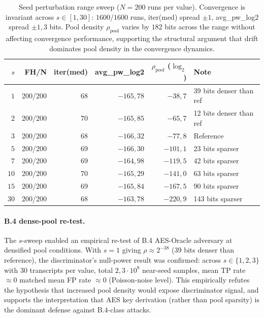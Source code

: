 \documentclass[11pt,a4paper]{article}
\begin{document}
\begin{table}[ht]
\centering
\small
\begin{tabular}{rrrrrl}
\toprule
$s$ & FH/N & iter(med) & avg\_pw\_log2 & $\rho_\text{pool}$ ($\log_2$) & Note \\
\midrule
$1$ & 200/200 & 68 & $-165{,}78$ & $-38{,}7$ & 39 bits denser than ref \\
$2$ & 200/200 & 70 & $-165{,}85$ & $-65{,}7$ & 12 bits denser than ref \\
$3$ & 200/200 & 68 & $-166{,}32$ & $-77{,}8$ & Reference \\
$5$ & 200/200 & 69 & $-166{,}30$ & $-101{,}1$ & 23 bits sparser \\
$7$ & 200/200 & 69 & $-164{,}98$ & $-119{,}5$ & 42 bits sparser \\
$10$ & 200/200 & 70 & $-165{,}29$ & $-141{,}0$ & 63 bits sparser \\
$15$ & 200/200 & 69 & $-165{,}84$ & $-167{,}5$ & 90 bits sparser \\
$30$ & 200/200 & 68 & $-163{,}78$ & $-220{,}9$ & 143 bits sparser \\
\bottomrule
\end{tabular}
\caption{Seed perturbation range sweep ($N = 200$ runs per value). Convergence is invariant across $s \in [1, 30]$: $1600/1600$ runs, iter(med) spread $\pm 1$, avg\_pw\_log2 spread $\pm 1{,}3$ bits. Pool density $\rho_\text{pool}$ varies by $182$ bits across the range without affecting convergence performance, supporting the structural argument that drift dominates pool density in the convergence dynamics.}
\label{tab:seed-sweep}
\end{table}

\paragraph{B.4 dense-pool re-test.} The $s$-sweep enabled an empirical re-test of B.4 AES-Oracle adversary at densified pool conditions. With $s = 1$ giving $\rho \approx 2^{-38}$ ($39$ bits denser than reference), the discriminator's null-power result was confirmed: across $s \in \{1, 2, 3\}$ with $30$ transcripts per value, total $2{,}3 \cdot 10^{8}$ near-seed samples, mean TP rate $\approx 0$ matched mean FP rate $\approx 0$ (Poisson-noise level). This empirically refutes the hypothesis that increased pool density would expose discriminator signal, and supports the interpretation that AES key derivation (rather than pool sparsity) is the dominant defense against B.4-class attacks.
\end{document}
